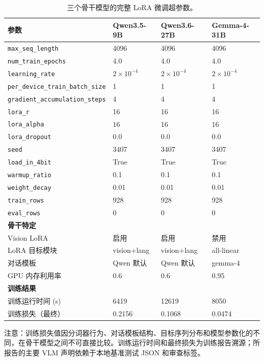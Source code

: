 \begin{table}[htbp]
  \centering
  \caption{三个骨干模型的完整 LoRA 微调超参数。}
  \label{tab:lora-hyperparams-full}
  \small
  \begin{tabular}{@{}llll@{}}
  \toprule
  \textbf{参数} & \textbf{Qwen3.5-9B} & \textbf{Qwen3.6-27B} & \textbf{Gemma-4-31B} \\
  \midrule
  \texttt{max\_seq\_length} & 4096 & 4096 & 4096 \\
  \texttt{num\_train\_epochs} & 4.0 & 4.0 & 4.0 \\
  \texttt{learning\_rate} & $2{\times}10^{-4}$ & $2{\times}10^{-4}$ & $2{\times}10^{-4}$ \\
  \texttt{per\_device\_train\_batch\_size} & 1 & 1 & 1 \\
  \texttt{gradient\_accumulation\_steps} & 4 & 4 & 4 \\
  \texttt{lora\_r} & 16 & 16 & 16 \\
  \texttt{lora\_alpha} & 16 & 16 & 16 \\
  \texttt{lora\_dropout} & 0.0 & 0.0 & 0.0 \\
  \texttt{seed} & 3407 & 3407 & 3407 \\
  \texttt{load\_in\_4bit} & True & True & True \\
  \texttt{warmup\_ratio} & 0.1 & 0.1 & 0.1 \\
  \texttt{weight\_decay} & 0.01 & 0.01 & 0.01 \\
  \texttt{train\_rows} & 928 & 928 & 928 \\
  \texttt{eval\_rows} & 0 & 0 & 0 \\
  \midrule
  \textbf{骨干特定} & & & \\
  \midrule
  Vision LoRA & 启用 & 启用 & 禁用 \\
  LoRA 目标模块 & vision+lang & vision+lang & all-linear \\
  对话模板 & Qwen 默认 & Qwen 默认 & gemma-4 \\
  GPU 内存利用率 & 0.6 & 0.6 & 0.95 \\
  \midrule
  \textbf{训练结果} & & & \\
  \midrule
  训练运行时间 (s) & 6419 & 12619 & 8050 \\
  训练损失（最终） & 0.2156 & 0.1068 & 0.0474 \\
  \bottomrule
  \end{tabular}
\end{table}

注意：训练损失值因分词器行为、对话模板结构、目标序列分布和模型参数化的不同，在骨干模型之间不可直接比较。训练运行时间和最终损失为训练报告溯源；所报告的主要 VLM 声明依赖于本地基准测试 JSON 和审查标签。

